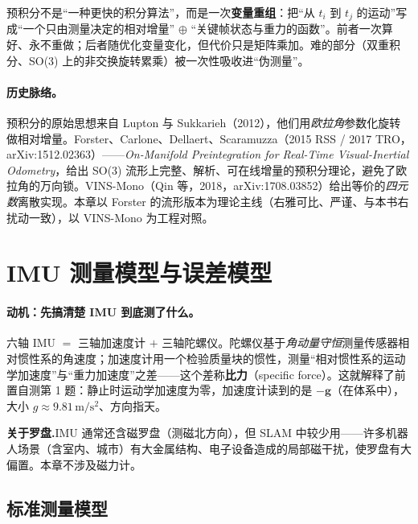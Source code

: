 \begin{insight}[预积分的本质]\label{ins:imu-essence}
预积分不是“一种更快的积分算法”，而是一次\textbf{变量重组}：把“从 $t_i$ 到 $t_j$ 的运动”写成“一个只由测量决定的相对增量” $\oplus$ “关键帧状态与重力的函数”。前者一次算好、永不重做；后者随优化变量变化，但代价只是矩阵乘加。难的部分（双重积分、SO(3) 上的非交换旋转累乘）被一次性吸收进“伪测量”。
\end{insight}

\paragraph{历史脉络。}
预积分的原始思想来自 Lupton 与 Sukkarieh（2012），他们用\emph{欧拉角}参数化旋转做相对增量\cite{forster2017preintegration}。Forster、Carlone、Dellaert、Scaramuzza（2015 RSS / 2017 TRO，arXiv:1512.02363）——\emph{On-Manifold Preintegration for Real-Time Visual-Inertial Odometry}，给出 SO(3) 流形上完整、解析、可在线增量的预积分理论，避免了欧拉角的万向锁\cite{forster2017preintegration}。VINS-Mono（Qin 等，2018，arXiv:1708.03852）给出等价的\emph{四元数}离散实现\cite{qin2018vins}。本章以 Forster 的流形版本为理论主线（右雅可比、严谨、与本书右扰动一致），以 VINS-Mono 为工程对照。

\section{IMU 测量模型与误差模型}
\label{sec:imu-meas}

\paragraph{动机：先搞清楚 IMU 到底测了什么。}
六轴 IMU $=$ 三轴加速度计 $+$ 三轴陀螺仪。陀螺仪基于\emph{角动量守恒}测量传感器相对惯性系的角速度；加速度计用一个检验质量块的惯性，测量“相对惯性系的运动学加速度”与“重力加速度”之差——这个差称\textbf{比力}（specific force）。这就解释了前置自测第 1 题：静止时运动学加速度为零，加速度计读到的是 $-\mathbf g$（在体系中），大小 $g\approx9.81\,\mathrm{m/s^2}$、方向指天。

\begin{note}
\textbf{关于罗盘.}\;IMU 通常还含磁罗盘（测磁北方向），但 SLAM 中较少用——许多机器人场景（含室内、城市）有大金属结构、电子设备造成的局部磁干扰，使罗盘有大偏置\cite{carlone2026handbook}。本章不涉及磁力计。
\end{note}

\subsection{标准测量模型}
\label{subsec:imu-std-model}

